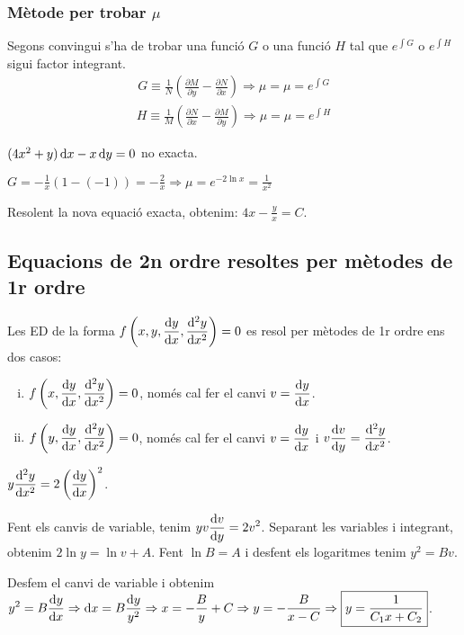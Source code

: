 \subsubsection*{Mètode per trobar $\mu$}
Segons convingui s'ha de trobar una funció $G$ o una funció $H$ tal que $e^{\int G}$ o $e^{\int H}$ sigui factor integrant.
\begin{align}
	\boxed{G \equiv \frac{1}{N} \left( \frac{\partial M}{\partial y} - \frac{\partial N}{\partial x} \right) \Rightarrow \mu = \mu = e^{\int G}}
\end{align}
\begin{align}
	\boxed{H \equiv \frac{1}{M} \left( \frac{\partial N}{\partial x} - \frac{\partial M}{\partial y} \right) \Rightarrow \mu = \mu = e^{\int H}}
\end{align}
\begin{example}
	$(4x^{2} + y) \mathop{}\!\mathrm{d} x - x \mathop{}\!\mathrm{d} y = 0$ no exacta.

	$\displaystyle G = - \frac{1}{x} (1 - (-1)) = - \frac{2}{x} \Rightarrow \mu = e^{-2 \ln x} = \frac{1}{x^{2}}$

	Resolent la nova equació exacta, obtenim: $\boxed{4x - \frac{y}{x} = C}$.
\end{example}
\subsection{Equacions de 2n ordre resoltes per mètodes de 1r ordre}
Les ED de la forma $\displaystyle f \left( x, y, \frac{\mathrm{d} y}{\mathrm{d} x}, \frac{\mathrm{d}^{2} y}{\mathrm{d} x^{2}} \right) = 0$ es resol per mètodes de 1r ordre ens dos casos:
\begin{enumerate}[i)]
	\item $\displaystyle f \left( x, \frac{\mathrm{d} y}{\mathrm{d} x}, \frac{\mathrm{d}^{2} y}{\mathrm{d} x^{2}} \right) = 0$, només cal fer el canvi $\displaystyle v = \frac{\mathrm{d} y}{\mathrm{d} x}$.
	\item $\displaystyle f \left( y, \frac{\mathrm{d} y}{\mathrm{d} x}, \frac{\mathrm{d}^{2} y}{\mathrm{d} x^{2}} \right) = 0$, només cal fer el canvi $\displaystyle v = \frac{\mathrm{d} y}{\mathrm{d} x}$ i $\displaystyle v \frac{\mathrm{d} v}{\mathrm{d} y} = \frac{\mathrm{d}^{2} y}{\mathrm{d} x^{2}}$.
\end{enumerate}
\begin{example}
	$\displaystyle y \frac{\mathrm{d}^{2} y}{\mathrm{d} x^{2}} = 2 \left( \frac{\mathrm{d} y}{\mathrm{d} x} \right)^{2}$.

	Fent els canvis de variable, tenim $\displaystyle y v \frac{\mathrm{d} v}{\mathrm{d} y} = 2v^{2}$. Separant les variables i integrant, obtenim $2 \ln y = \ln v + A$. Fent $\ln B = A$ i desfent els logaritmes tenim $y^{2} = Bv$.

	Desfem el canvi de variable i obtenim $\displaystyle y^{2} = B \frac{\mathrm{d} y}{\mathrm{d} x} \Rightarrow \mathrm{d} x = B \frac{\mathrm{d} y}{y^{2}} \Rightarrow x = - \frac{B}{y} + C \Rightarrow y = - \frac{B}{x-C} \Rightarrow \boxed{y = \frac{1}{C_{1} x + C_{2}}}$.
\end{example}

